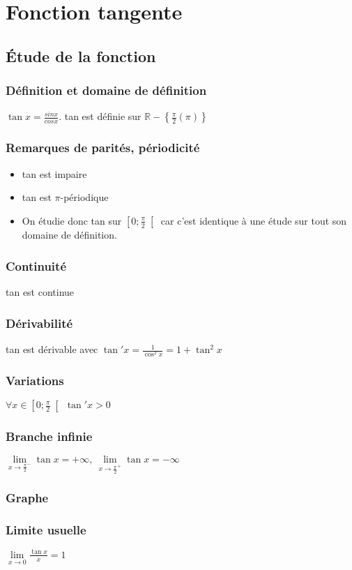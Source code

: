 \documentclass[12pt,a4paper,french]{book}
\begin{document}
	\section{Fonction tangente}
		\subsection{Étude de la fonction}
			\subsubsection{Définition et domaine de définition}
			$\tan x =  \frac{sin x}{cos x}$. tan est définie sur $\mathbb{R}-\left\lbrace \frac{\pi}{2} (\pi)\right\rbrace$
			\subsubsection{Remarques de parités, périodicité}
				\begin{itemize}
					\item tan est impaire
					\item tan est $\pi$-périodique
					\item On étudie donc tan sur $\left[ 0;\frac{\pi}{2}\right[ $ car c'est identique à une étude sur tout son domaine de définition.
				\end{itemize}
			\subsubsection{Continuité}
			tan est continue
			\subsubsection{Dérivabilité}
			tan est dérivable avec $\tan' x = \frac{1}{\cos^{2}x} = 1 + \tan^{2} x$
			\subsubsection{Variations}
			$\forall x \in \left[ 0;\frac{\pi}{2}\right[ \ \tan' x > 0$
			\subsubsection{Branche infinie}
			$ \lim\limits_{x \to \frac{\pi}{2}^{-}} \tan x =+\infty, \  \lim\limits_{x \to \frac{\pi}{2}^{+}} \tan x =-\infty$ 
			\subsubsection{Graphe}
			\subsubsection{Limite usuelle}
			$  \lim\limits_{x \to 0} \frac{\tan x}{x} = 1$
\end{document}
